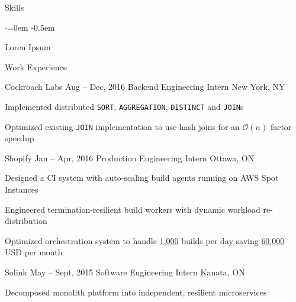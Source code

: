 \documentclass{resume} %
\begin{document}

\begin{rSection}{Skills}
  \vspace {0.5em}
  \begin{list}{$\cdot$}{\leftmargin=0em}
    \itemsep -0.5em \vspace{-0.5em}
    \item Loren Ipsum
  \end{list}
  \vspace{0.5em}
\end{rSection}


\begin{rSection}{Work Experience}
  \begin{rSubsection}{Cockroach Labs}
                     {Aug -- Dec, 2016}
                     {Backend Engineering Intern}
                     {New York, NY}
    \item Implemented distributed \texttt{SORT}, \texttt{AGGREGATION},
      \texttt{DISTINCT} and \texttt{JOIN}s
    \item Optimized existing \texttt{JOIN} implementation to use hash joins for
      an $\mathcal{O}(n)$ factor speedup
  \end{rSubsection}

  \begin{rSubsection}{Shopify}
                     {Jan -- Apr, 2016}
                     {Production Engineering Intern}
                     {Ottawa, ON}

  \item Designed a CI system with auto-scaling build agents running on AWS Spot
    Instances 
  \item Engineered termination-resilient build workers with dynamic workload
    re-distribution
  \item Optimized orchestration system to handle \underline{1,000} builds per
    day saving \underline{60,000} USD per month
  \end{rSubsection}

  \begin{rSubsection}{Solink}
                     {May -- Sept, 2015}
                     {Software Engineering Intern}
                     {Kanata, ON}
    \item Decomposed monolith platform into independent, resilient
      microservices
  \end{rSubsection}
\end{rSection}
\end{document}
